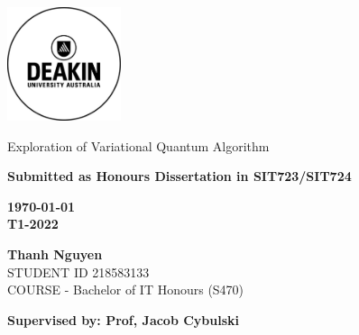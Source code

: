 \thispagestyle{empty}
\begin{titlepage}
    \includegraphics[width=0.25\textwidth]{src/CoverPage/Deakin_Logo.jpeg}
        \begin{center}
        \vspace*{4cm}
        {\LARGE Exploration of Variational Quantum Algorithm} %
        \vspace{3cm}
            \begin{large}   
    
        
            \bf Submitted as Honours Dissertation in SIT723/SIT724
            \vspace{1cm}
        
            \bf \today \\
            T1-2022        
        
            \vspace{3cm}
            \textbf{Thanh Nguyen}\\
            STUDENT ID 218583133 \\
            COURSE - Bachelor of IT Honours (S470)
            \vfill

            \bf \normalsize Supervised by: Prof, Jacob Cybulski\\
       
        \end{large}  
   \end{center}
\end{titlepage}

